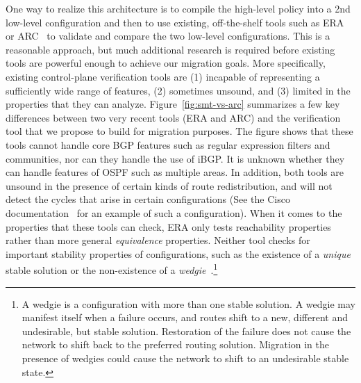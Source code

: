 One way to realize this architecture is to compile the high-level policy into a 2nd low-level configuration
and then to use existing, off-the-shelf tools such as ERA~\cite{era} or ARC~\cite{arc} to validate and compare
the two low-level configurations.  This is a reasonable approach, but much additional research is required before existing
tools are powerful enough to achieve our migration goals.  More specifically, 
existing control-plane verification tools are (1) incapable of representing a sufficiently
wide range of features, (2) sometimes unsound,
 and (3) limited in the properties that they can analyze.
Figure~\ref{fig:smt-vs-arc} summarizes
a few key differences between two very recent tools (ERA and ARC) and the verification tool that we propose to
build for migration purposes.  The figure shows that these tools cannot handle
core BGP features such as regular expression filters and communities, nor can they handle the use of iBGP.
It is unknown whether they can handle features of OSPF such as multiple areas.  In addition, 
both tools are unsound in the presence of certain kinds of route redistribution, and will not
detect the cycles that arise in certain 
configurations (See the Cisco documentation~\cite{cisco-route-redistribution} for an example of such a configuration).
When it comes to the properties
that these tools can check, ERA only tests reachability properties rather than more general \emph{equivalence} properties.  
Neither tool checks for important stability
properties of configurations, such as the existence of a \emph{unique} stable solution or the non-existence of
a \emph{wedgie}~\cite{bgp-wedgie}.\footnote{A wedgie is a configuration with more than one stable solution.  A wedgie may manifest itself 
when a failure occurs, and routes shift to a new, different and
undesirable, but stable solution.  Restoration of the failure does not cause the network to shift back to the preferred routing solution.  Migration in the presence
of wedgies could cause the network to shift to an undesirable stable state.}  

